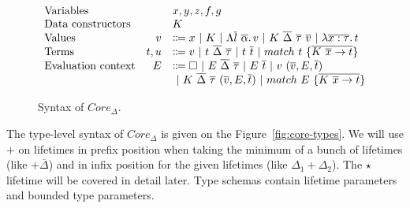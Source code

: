 \documentclass[11pt]{article}
\newcommand{\vor}{~|~}
\newcommand{\ap}{~}
\begin{document}
    \begin{figure}
        \centering
        \[
            \begin{array}{lrl}
                \text{Variables}          &   & x, y, z, f, g                                                                                                                          \\
                \text{Data constructors}  &   & K                                                                                                                                      \\
                \text{Values} & v & \Coloneqq x \vor K \vor \Lambda \overline{l}~\overline{\alpha} \ldotp v \vor K\ap\overline{\Delta}\ap \overline{\tau} \ap \overline{v} \vor \lambda \overline{x : \tau}\ldotp t
                \\
                \text{Terms} & t, u & \Coloneqq v \vor t\ap\overline{\Delta}\ap\overline{\tau} \vor t\ap \overline{t} \vor match ~ t ~\{\overline{K \ap \overline{x} \to t}\}
                \\
                \text{Evaluation context} & E & \Coloneqq \square \vor E \ap\overline{\Delta}\ap \overline{\tau} \vor E \ap \overline{t} \vor v \ap (\overline{v}, E, \overline{t})    \\
                &   & \vor K\ap\overline{\Delta}\ap\overline{\tau}\ap(\overline{v}, E, \overline{t}) \vor match\ap E\ap \{\overline{K\ap\overline{x}\to t}\}
            \end{array}
        \]
        \caption{Syntax of $Core_\Delta$.}
        \label{fig:core-syntax}
    \end{figure}

    The type-level syntax of $Core_\Delta$ is given on the Figure\ \ref{fig:core-types}.
    We will use $+$ on lifetimes in prefix position when taking the minimum of a bunch of lifetimes (like $+\overline{\Delta}$) and in infix position for the given lifetimes (like $\Delta_1 + \Delta_2$).
    The $\star$ lifetime will be covered in detail later. %
    Type schemas contain lifetime parameters and bounded type parameters.
\end{document}
